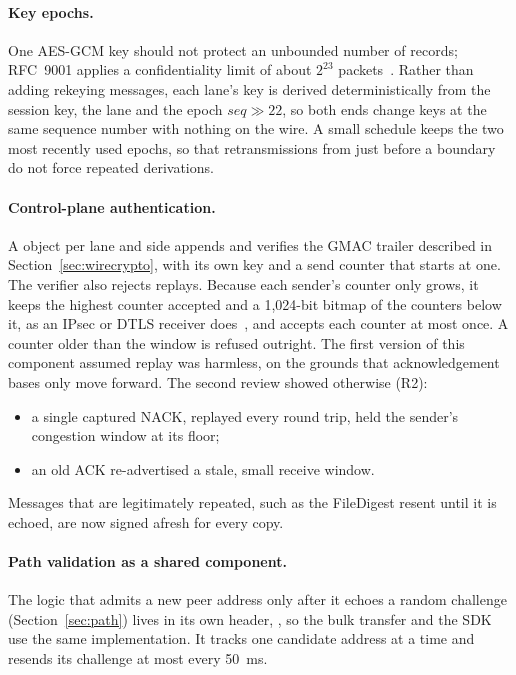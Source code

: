 \paragraph{Key epochs\vviii.} One AES-GCM key should not protect an unbounded number of records; RFC~9001
applies a confidentiality limit of about $2^{23}$ packets~\cite{rfc9001}. Rather than adding rekeying messages,
each lane's key is derived deterministically from the session key, the lane and the epoch
$\mathit{seq}\gg22$, so both ends change keys at the same sequence number with nothing on the wire. A small
schedule keeps the two most recently used epochs, so that retransmissions from just before a boundary do not
force repeated derivations.

\paragraph{Control-plane authentication\vviii.} A  object per lane and side appends and
verifies the GMAC trailer described in Section~\ref{sec:wirecrypto}, with its own key and a send counter that
starts at one. The verifier also rejects replays. Because each sender's counter only grows, it keeps the
highest counter accepted and a 1,024-bit bitmap of the counters below it, as an IPsec or DTLS receiver
does~\cite{rfc6347}, and accepts each counter at most once. A counter older than the window is refused
outright. The first version of this component assumed replay was harmless, on the grounds that acknowledgement
bases only move forward. The second review showed otherwise (R2):
\begin{itemize}
  \item a single captured NACK, replayed every round trip, held the sender's congestion window at its floor;
  \item an old ACK re-advertised a stale, small receive window.
\end{itemize}
Messages that are legitimately repeated, such as the FileDigest resent until it is echoed, are now signed
afresh for every copy.

\paragraph{Path validation as a shared component\vviii.} The logic that admits a new peer address only after
it echoes a random challenge (Section~\ref{sec:path}) lives in its own header, , so the
bulk transfer and the SDK use the same implementation. It tracks one candidate address at a time and resends
its challenge at most every 50~ms.

